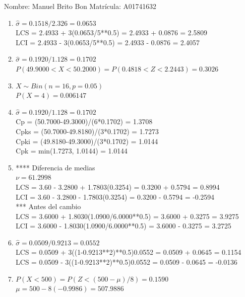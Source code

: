\documentclass[8pt]{report}
\begin{document}
 \newpage

Nombre: \underline{\hspace*{.2in}}
Manuel Brito Bon
\underline{\hspace*{.2in}} \quad Matr\'icula:\underline{\hspace*{.2in}}
A01741632
\underline{\hspace*{.2in}} \\

\begin{enumerate}
\item $\hat\sigma = 0.1518/2.326 = 0.0653$\\
LCS = 2.4933 + 3(0.0653/5**0.5) = 2.4933 + 0.0876 = 2.5809\\
LCI = 2.4933 - 3(0.0653/5**0.5) = 2.4933 - 0.0876 = 2.4057
\item $\hat\sigma = 0.1920/1.128 = 0.1702$\\
$P(49.9000 < X < 50.2000) = P(0.4818 < Z < 2.2443) = 0.3026$\\
\item $X \sim Bin(n=16, p=0.05)$\\
$P(X = 4) = 0.006147$
\item $\hat\sigma = 0.1920/1.128 = 0.1702$\\
Cp = (50.7000-49.3000)/(6*0.1702) = 1.3708\\
Cpks = (50.7000-49.8180)/(3*0.1702) = 1.7273\\
Cpki = (49.8180-49.3000)/(3*0.1702) = 1.0144\\
Cpk = min(1.7273, 1.0144) = 1.0144
\item **** Diferencia de medias\\
$\nu = 61.2998$\\
LCS = 3.60 - 3.2800 + 1.7803(0.3254) = 0.3200 + 0.5794 = 0.8994\\
LCI = 3.60 - 3.2800 - 1.7803(0.3254) = 0.3200 - 0.5794 = -0.2594\\
*** Antes del cambio\\
LCS = 3.6000 + 1.8030(1.0900/6.0000**0.5) = 3.6000 + 0.3275 = 3.9275\\
LCI = 3.6000 - 1.8030(1.0900/6.0000**0.5) = 3.6000 - 0.3275 = 3.2725\\
\item $\hat\sigma = 0.0509/0.9213 = 0.0552$\\
LCS = 0.0509 + 3((1-0.9213**2)**0.5)0.0552 = 0.0509 + 0.0645 = 0.1154\\
LCS = 0.0509 - 3((1-0.9213**2)**0.5)0.0552 = 0.0509 - 0.0645 = -0.0136
\item $P(X < 500) = P(Z < (500-\mu)/8) = 0.1590$\\
$\mu = 500 - 8(-0.9986) = 507.9886$\\
\end{enumerate}
\end{document}
